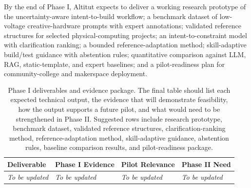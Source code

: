 By the end of Phase I, Altitut expects to deliver a working research prototype of the uncertainty-aware intent-to-build workflow; a benchmark dataset of low-voltage creative-hardware prompts with expert annotations; validated reference structures for selected physical-computing projects; an intent-to-constraint model with clarification ranking; a bounded reference-adaptation method; skill-adaptive build/test guidance with abstention rules; quantitative comparison against LLM, RAG, static-template, and expert baselines; and a pilot-readiness plan for community-college and makerspace deployment.

\begin{table}[H]
\centering
\caption{Phase I deliverables and evidence package. The final table should list each expected technical output, the evidence that will demonstrate feasibility, how the output supports a future pilot, and what would need to be strengthened in Phase II. Suggested rows include research prototype, benchmark dataset, validated reference structures, clarification-ranking method, reference-adaptation method, skill-adaptive guidance, abstention rules, baseline comparison results, and pilot-readiness package.}
\label{tab:phase1_deliverables}
\renewcommand{\arraystretch}{1.12}
\small
\begin{tabular}{p{} p{} p{} p{}}
\hline
\textbf{Deliverable} & \textbf{Phase I Evidence} & \textbf{Pilot Relevance} & \textbf{Phase II Need} \\
\hline
\textit{To be updated} & \textit{To be updated} & \textit{To be updated} & \textit{To be updated} \\
\hline
\end{tabular}
\end{table}





